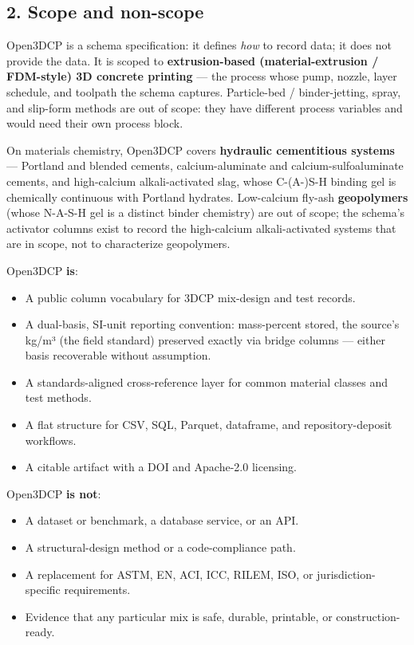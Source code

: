 \documentclass[
  11pt,
  letterpaper,
]{article}
\providecommand{\tightlist}{%
  \setlength{\itemsep}{0pt}\setlength{\parskip}{0pt}}
\begin{document}
\subsection{2. Scope and non-scope}\label{scope-and-non-scope}

Open3DCP is a schema specification: it defines \emph{how} to record
data; it does not provide the data. It is scoped to
\textbf{extrusion-based (material-extrusion / FDM-style) 3D concrete
printing} --- the process whose pump, nozzle, layer schedule, and
toolpath the schema captures. Particle-bed / binder-jetting, spray, and
slip-form methods are out of scope: they have different process
variables and would need their own process block.

On materials chemistry, Open3DCP covers \textbf{hydraulic cementitious
systems} --- Portland and blended cements, calcium-aluminate and
calcium-sulfoaluminate cements, and high-calcium alkali-activated slag,
whose C-(A-)S-H binding gel is chemically continuous with Portland
hydrates. Low-calcium fly-ash \textbf{geopolymers} (whose N-A-S-H gel is
a distinct binder chemistry) are out of scope; the schema's activator
columns exist to record the high-calcium alkali-activated systems that
are in scope, not to characterize geopolymers.

Open3DCP \textbf{is}:

\begin{itemize}
\tightlist
\item
  A public column vocabulary for 3DCP mix-design and test records.
\item
  A dual-basis, SI-unit reporting convention: mass-percent stored, the
  source's kg/m³ (the field standard) preserved exactly via bridge
  columns --- either basis recoverable without assumption.
\item
  A standards-aligned cross-reference layer for common material classes
  and test methods.
\item
  A flat structure for CSV, SQL, Parquet, dataframe, and
  repository-deposit workflows.
\item
  A citable artifact with a DOI and Apache-2.0 licensing.
\end{itemize}

Open3DCP \textbf{is not}:

\begin{itemize}
\tightlist
\item
  A dataset or benchmark, a database service, or an API.
\item
  A structural-design method or a code-compliance path.
\item
  A replacement for ASTM, EN, ACI, ICC, RILEM, ISO, or
  jurisdiction-specific requirements.
\item
  Evidence that any particular mix is safe, durable, printable, or
  construction-ready.
\end{itemize}
\end{document}
